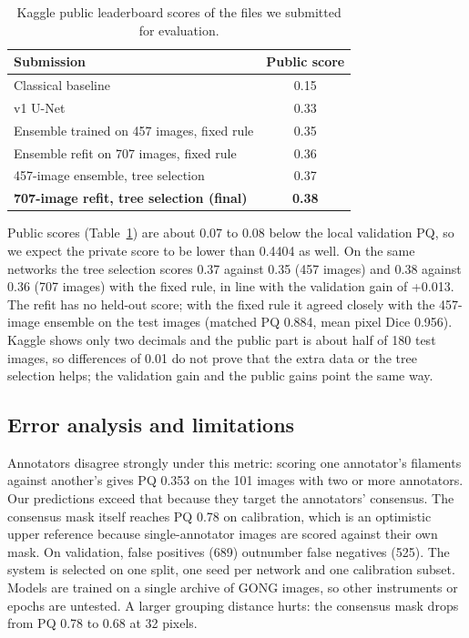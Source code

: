 \documentclass[sigconf]{acmart}
\begin{document}
\begin{table}[h]
\caption{Kaggle public leaderboard scores of the files we submitted for evaluation.}\label{tab:public}
\centering\small\begin{tabular}{@{}lc@{}}\toprule
Submission & Public score\\\midrule
Classical baseline & 0.15\\
v1 U-Net & 0.33\\
Ensemble trained on 457 images, fixed rule & 0.35\\
Ensemble refit on 707 images, fixed rule & 0.36\\
457-image ensemble, tree selection & 0.37\\
\textbf{707-image refit, tree selection (final)} & \textbf{0.38}\\\bottomrule
\end{tabular}
\end{table}
Public scores (Table~\ref{tab:public}) are about 0.07 to 0.08 below the local validation PQ, so we expect the private score to be lower than 0.4404 as well. On the same networks the tree selection scores 0.37 against 0.35 (457 images) and 0.38 against 0.36 (707 images) with the fixed rule, in line with the validation gain of +0.013. The refit has no held-out score; with the fixed rule it agreed closely with the 457-image ensemble on the test images (matched PQ 0.884, mean pixel Dice 0.956). Kaggle shows only two decimals and the public part is about half of 180 test images, so differences of 0.01 do not prove that the extra data or the tree selection helps; the validation gain and the public gains point the same way.

\subsection{Error analysis and limitations}
Annotators disagree strongly under this metric: scoring one annotator's filaments against another's gives PQ 0.353 on the 101 images with two or more annotators. Our predictions exceed that because they target the annotators' consensus. The consensus mask itself reaches PQ 0.78 on calibration, which is an optimistic upper reference because single-annotator images are scored against their own mask. On validation, false positives (689) outnumber false negatives (525). The system is selected on one split, one seed per network and one calibration subset. Models are trained on a single archive of GONG images, so other instruments or epochs are untested. A larger grouping distance hurts: the consensus mask drops from PQ 0.78 to 0.68 at 32 pixels.
\end{document}
